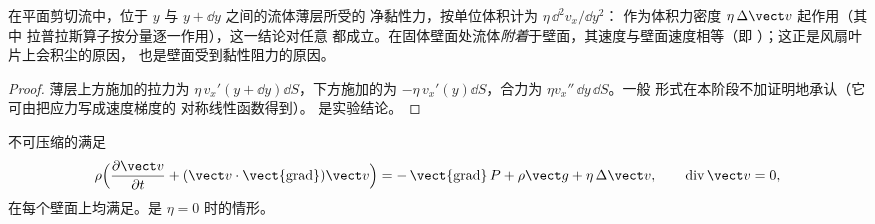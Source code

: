 \begin{proposition}\label{prop:b2:viscous-flows:density}
在平面剪切流中，位于 $y$ 与 $y + \dd y$ 之间的流体薄层所受的
净黏性力，按单位体积计为 $\eta\,\dd^2v_x/\dd y^2$：
作为体积力密度 $\eta\,\Delta\vect v$ 起作用（其中
拉普拉斯算子按分量逐一作用），这一结论对任意
都成立。在固体壁面处流体\emph{附着}于壁面，其速度与壁面速度相等（即
\emph{}）；这正是风扇叶片上会积尘的原因，
也是壁面受到黏性阻力的原因。
\end{proposition}

\begin{proof}
薄层上方施加的拉力为 $\eta\,v_x'(y + \dd y)\dd S$，下方施加的为
$-\eta\,v_x'(y)\dd S$，合力为 $\eta v_x''\,\dd y\,\dd S$。一般
形式在本阶段不加证明地承认（它可由把应力写成速度梯度的
对称线性函数得到）。
是实验结论。
\end{proof}

\begin{theorem}[纳维–斯托克斯方程]\label{thm:b2:viscous-flows:ns}
不可压缩的满足
\[
\rho\Bigl(\frac{\partial\vect v}{\partial t} + (\vect v\cdot\operatorname{\vect{grad}})
\vect v\Bigr) = -\operatorname{\vect{grad}}P + \rho\vect g + \eta\,\Delta\vect v ,
\qquad \operatorname{div}\vect v = 0 ,
\]
在每个壁面上均满足。是
$\eta = 0$ 时的情形。
\end{theorem}
\admitted

